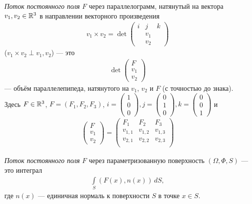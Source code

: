 \begin{df}
 \textit{Поток постоянного поля} $F$ через параллелограмм, натянутый на вектора $v_1, v_2 \in \mathbb{R}^{3}$ в направлении векторного произведения
 \begin{align*}
  v_1 \times v_2 = \det \begin{pmatrix}
   i & j & k \\
    & v_1 &  \\
    & v_2 &  
  \end{pmatrix}
 \end{align*} ($v_1 \times v_2 \perp v_1, v_2$) --- это
 \begin{align*}
  \det \begin{pmatrix}
   F \\
   v_1 \\
    v_2
  \end{pmatrix}
 \end{align*} --- объём параллелепипеда, натянутого на $v_1$, $v_2$ и $F$ (с точностью до знака).  Здесь $F \in \mathbb{R}^{3}$, $F = (F_1, F_2, F_3)$, $i = \begin{pmatrix}
  1 \\ 0 \\ 0
 \end{pmatrix}, j = \begin{pmatrix}
  0 \\ 1 \\ 0
 \end{pmatrix}, k = \begin{pmatrix}
  0 \\ 0 \\ 1
 \end{pmatrix}$ и
 \begin{align*}
  \begin{pmatrix}
   F \\ v_1 \\ v_2
  \end{pmatrix} = \begin{pmatrix}
  F_1 & F_2 & F_3 \\
  v_{1,1} & v_{1,2} & v_{1,3} \\
  v_{2,1} & v_{2,2} & v_{2,3} \\
  \end{pmatrix}
 \end{align*} 
\end{df}
\begin{df}
 \textit{Поток постоянного поля} $F$ через параметризованную поверхность $(\Omega, \Phi, S)$ --- это интеграл
 \begin{align*}
  \int\limits_{S} (F(x), n(x)) \, dS
 ,\end{align*}  где $n(x)$ --- единичная нормаль к поверхности $S$ в точке $x \in S$.
\end{df}

